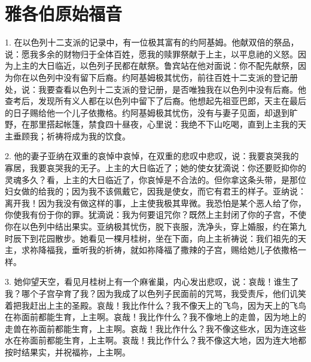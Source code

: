 
\chapter{雅各伯原始福音}


\par

1. 在以色列十二支派的记录中，有一位极其富有的约阿基姆。他献双倍的祭品，说：愿我多余的财物归于全体百姓，愿我的赎罪祭献于上主，以平息祂的义怒。因为上主的大日临近，以色列子民都在献祭。鲁宾站在他对面说：你不配先献祭，因为你在以色列中没有留下后裔。约阿基姆极其忧伤，前往百姓十二支派的登记册处，说：我要查看以色列十二支派的登记册，是否唯独我在以色列中没有后裔。他查考后，发现所有义人都在以色列中留下了后裔。他想起先祖亚巴郎，天主在最后的日子赐给他一个儿子依撒格。约阿基姆极其忧伤，没有与妻子见面，却退到旷野，在那里搭起帐篷，禁食四十昼夜，心里说：我绝不下山吃喝，直到上主我的天主垂顾我；祈祷将成为我的饮食。\par

2. 他的妻子亚纳在双重的哀悼中哀悼，在双重的悲叹中悲叹，说：我要哀哭我的寡居，我要哀哭我的无子。上主的大日临近了；她的使女犹滴说：你还要贬抑你的灵魂多久？看，上主的大日临近了，你哀悼是不合法的。但你拿这条头带，是那位妇女做的给我的；因为我不该佩戴它，因我是使女，而它有君王的样子。亚纳说：离开我！因为我没有做这样的事，上主使我极其卑微。我恐怕是某个恶人给了你，你使我有份于你的罪。犹滴说：我为何要诅咒你？既然上主封闭了你的子宫，不使你在以色列中结出果实。亚纳极其忧伤，脱下丧服，洗净头，穿上婚服，约在第九时辰下到花园散步。她看见一棵月桂树，坐在下面，向上主祈祷说：我们祖先的天主，求祢降福我，垂听我的祈祷，就如祢降福了撒辣的子宫，赐给她儿子依撒格一样。\par

3. 她仰望天空，看见月桂树上有一个麻雀巢，内心发出悲叹，说：哀哉！谁生了我？哪个子宫孕育了我？因为我成了以色列子民面前的咒骂，我受责斥，他们讥笑着把我赶出上主的圣殿。哀哉！我比作什么？我不像天上的飞鸟，因为天上的飞鸟在祢面前都能生育，上主啊。哀哉！我比作什么？我不像地上的走兽，因为地上的走兽在祢面前都能生育，上主啊。哀哉！我比作什么？我不像这些水，因为连这些水在祢面前都能生育，上主啊。哀哉！我比作什么？我不像这大地，因为连大地都按时结果实，并祝福祢，上主啊。\par

